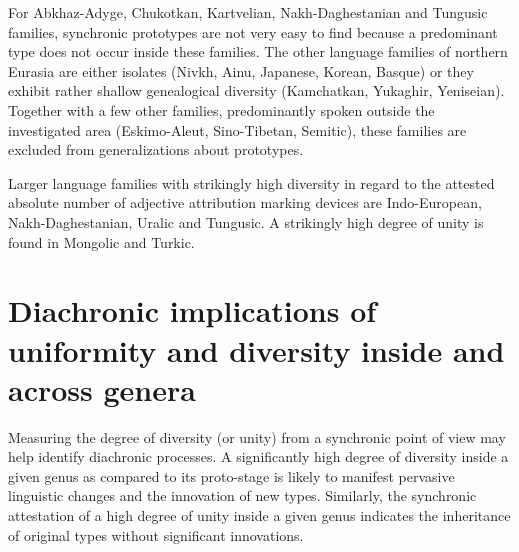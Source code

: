 For Abkhaz-Adyge, Chukotkan, Kartvelian, Nakh-Daghestanian and Tungusic families, synchronic prototypes are not very easy to find because a predominant type does not occur inside these families. The other language families of northern Eurasia are either isolates (Nivkh, Ainu, Japanese, Korean, Basque) or they exhibit rather shallow genealogical diversity (Kamchatkan, Yukaghir, Yeniseian). Together with a few other families, predominantly spoken outside the investigated area (Eskimo-Aleut, Sino-Tibetan, Semitic), these families are excluded from generalizations about prototypes. 

Larger language families with strikingly high diversity in regard to the attested absolute number of adjective attribution marking devices are Indo-European, Nakh-Daghestanian, Uralic and Tungusic. A strikingly high degree of unity is found in Mongolic and Turkic.

\section[Diachronic implications]{Diachronic implications of uniformity and diversity inside and across genera}
Measuring the degree of diversity (or unity) from a synchronic point of view may help identify diachronic processes. A significantly high degree of diversity inside a given genus as compared to its proto-stage is likely to manifest pervasive linguistic changes and the innovation of new types. Similarly, the synchronic attestation of a high degree of unity inside a given genus indicates the inheritance of original types without significant innovations. 

